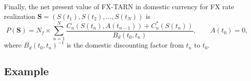 Finally, the net present value of FX-TARN in domestic currency for FX rate realization $\mathbf{S} = (S(t_1),S(t_2),\ldots,S(t_N))$ is
\[P(\mathbf{S}) =N_f \times \sum_{n=1}^N\frac{C_n(S(t_n),A(t_{n-1}))+C^\ast_n(S(t_n))}{B_d(t_0,t_n)}, \qquad A(t_0)=0,\]
where $B_d(t_0,t_n)^{-1}$ is the domestic discounting factor from $t_n$ to $t_0$.

\subsection*{Example}
\label{sec:TARN:Example}